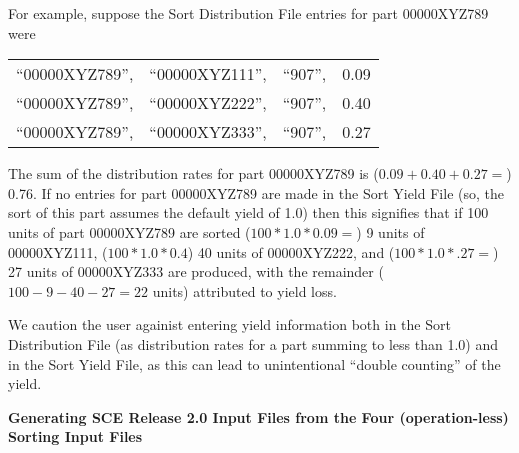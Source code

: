 \begin{itemize}
For example, suppose the Sort Distribution File entries for part
00000XYZ789 were
\begin{center}
\begin{tabular}{llll}
  ``00000XYZ789'', &``00000XYZ111'', &``907'', &0.09 \\
  ``00000XYZ789'', &``00000XYZ222'', &``907'', &0.40 \\
  ``00000XYZ789'', &``00000XYZ333'', &``907'', &0.27
\end{tabular}
\end{center}
The  sum  of the distribution rates for part 00000XYZ789  is
($0.09+0.40+0.27=$) 0.76. If no entries for part 00000XYZ789 are made in
the Sort Yield File  (so, the sort  of  this part assumes the  default
yield  of  1.0)  then  this signifies  that  if  100 units  of   part
00000XYZ789  are  sorted   ($100*1.0*0.09=$)  9 units    of 00000XYZ111,
($100*1.0*0.4$) 40 units of 00000XYZ222, and ($100*1.0*.27=$) 27 units of
00000XYZ333  are produced, with the remainder ($100-9-40-27=22$ units)
attributed to yield loss.

We caution the user againist entering yield information both in the
Sort Distribution File (as distribution rates for a part summing to
less than 1.0) and in the Sort Yield File, as this can lead to
unintentional ``double counting'' of the yield. 

\end{itemize}



\clearpage
\noindent
{\bf Generating SCE Release 2.0 Input Files from the Four
(operation-less) Sorting Input Files}
 
\vspace{.5in}

